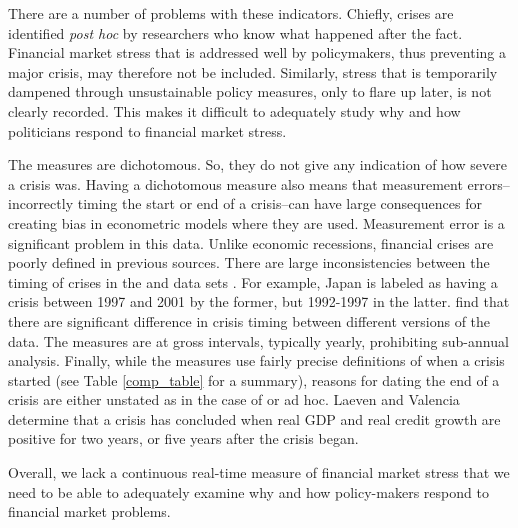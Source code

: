 \documentclass[]{article}
\begin{document}
There are a number of problems with these indicators. Chiefly, crises are identified \emph{post hoc} by researchers who know what happened after the fact. Financial market stress that is addressed well by policymakers, thus preventing a major crisis, may therefore not be included. Similarly, stress that is temporarily dampened through unsustainable policy measures, only to flare up later, is not clearly recorded. This makes it difficult to adequately study why and how politicians respond to financial market stress.

The measures are dichotomous. So, they do not give any indication of how
severe a crisis was. Having a dichotomous measure also means that measurement errors--incorrectly timing the start or end of a crisis--can have large consequences for creating bias in econometric models where they are used. Measurement error is a significant problem in this data. Unlike economic recessions, financial crises are poorly defined in previous sources. There are large inconsistencies between the timing of crises in the \cite{laeven2013} and \cite{Reinhart2009} data sets \citep{Chaudron2014}. For example, Japan is labeled as having a crisis between 1997 and 2001 by the former, but 1992-1997 in the latter. \cite{GandrudHallerberg2015} find that there are significant difference in crisis timing between different versions of the \cite{laeven2013} data. The measures are at gross intervals, typically yearly, prohibiting sub-annual analysis. Finally, while the measures use fairly precise definitions of when a crisis started (see Table \ref{comp_table} for a summary), reasons for dating the end of a crisis are either unstated as in the case of \cite{Reinhart2009} or ad hoc. Laeven and Valencia \citeyearpar[footnote 19]{laeven2013} determine that a crisis has concluded when real GDP and real credit growth are positive for two years, or five years after the crisis began.

Overall, we lack a continuous real-time measure of financial market stress that we need to be able to adequately examine why and how policy-makers respond to financial market problems.
\end{document}
